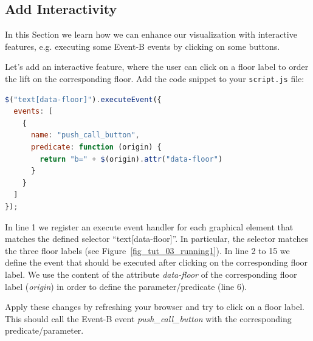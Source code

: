 \subsection{Add Interactivity}

In this Section we learn how we can enhance our visualization with interactive features, e.g. executing some Event-B events by clicking on some buttons.

Let's add an interactive feature, where the user can click on a floor label to order the lift on the corresponding floor.
Add the code snippet to your \texttt{script.js} file:
\newpage
\begin{lstlisting}[language=JavaScript, caption={Example of an Interactive Feature (JavaScript)}]
$("text[data-floor]").executeEvent({
  events: [
    {
      name: "push_call_button", 
      predicate: function (origin) {
        return "b=" + $(origin).attr("data-floor")
      }
    }
  ]
});
\end{lstlisting}
In line 1 we register an execute event handler for each graphical element that matches the defined selector ``text[data-floor]''.
In particular, the selector matches the three floor labels (see Figure~\ref{fig_tut_03_running1}).
In line 2 to 15 we define the event that should be executed after clicking on the corresponding floor label.
We use the content of the attribute \textit{data-floor} of the corresponding floor label (\textit{origin}) in order to define the parameter/predicate (line 6).

Apply these changes by refreshing your browser and try to click on a floor label.
This should call the Event-B event \textit{push\_call\_button} with the corresponding predicate/parameter.

